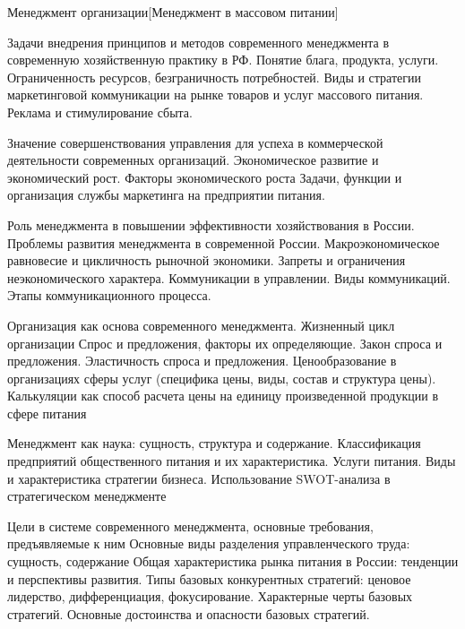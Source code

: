 \documentclass[
	11pt,
	a4paper,
	]
	{article}
\begin{document}
 {Менеджмент организации}[Менеджмент в массовом питании]

	

\noindent{} 
	{
		Задачи внедрения принципов и методов современного менеджмента в современную хозяйственную практику в РФ.
	}{
		Понятие блага, продукта, услуги. Ограниченность ресурсов, безграничность потребностей.
	}{
		Виды и стратегии маркетинговой коммуникации на рынке товаров и услуг массового питания. Реклама и стимулирование сбыта.
	}

\bigskip

\noindent{} 
	{
		Значение совершенствования управления для успеха в коммерческой деятельности современных организаций.
	}{
		Экономическое развитие и экономический рост. Факторы экономического роста
	}{
		Задачи, функции и организация службы маркетинга на предприятии питания.
	}

\bigskip

\noindent{} 
	{
		Роль менеджмента в повышении эффективности хозяйствования в России. Проблемы развития менеджмента в современной России.
	}{
		Макроэкономическое равновесие и цикличность рыночной экономики. Запреты и ограничения неэкономического характера.
	}{
		Коммуникации в управлении. Виды коммуникаций. Этапы коммуникационного процесса.
	}

\bigskip

\noindent{} 
	{
		Организация как основа современного менеджмента. Жизненный цикл организации
	}{
		Спрос и предложения, факторы их определяющие. Закон спроса и предложения. Эластичность спроса и предложения.
	}{
		Ценообразование в организациях сферы услуг (специфика цены, виды, состав и структура цены). Калькуляции как способ расчета цены на единицу произведенной продукции в сфере питания
	}

\bigskip

\noindent{} 
	{
		Менеджмент как наука: сущность, структура и содержание.
	}{
		Классификация предприятий общественного питания и их характеристика. Услуги питания.
	}{
		Виды и характеристика стратегии бизнеса. Использование SWOT-анализа в стратегическом менеджменте
	}

\bigskip

\noindent{} 
	{
		Цели в системе современного менеджмента, основные требования, предъявляемые к ним Основные виды разделения управленческого труда: сущность, содержание
	}{
		Общая характеристика рынка питания в России: тенденции и перспективы развития.
	}{
		Типы базовых конкурентных стратегий: ценовое лидерство, дифференциация, фокусирование. Характерные черты базовых стратегий. Основные достоинства и опасности базовых стратегий.
	}
\end{document}
